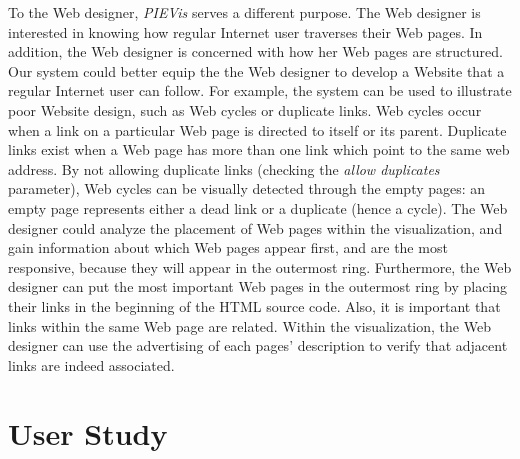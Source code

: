 \documentclass[]{article}
\begin{document}
{To the Web designer, {\em PIEVis} serves a different purpose.  The Web designer is interested in knowing how regular Internet user traverses their Web pages.
In addition, the Web designer is concerned with how her Web pages are structured.  
Our system could better equip the the Web designer to develop a Website that a regular Internet user can follow.  
For example, the system can be used to illustrate poor Website design, such as Web cycles or duplicate links.  
Web cycles occur when a link on a particular Web page is directed to itself or its parent. 
Duplicate links exist when a Web page has more than one link which point to the same web address.  
By not allowing duplicate links (checking the {\em allow duplicates} parameter), Web cycles can be visually detected through the empty pages: an empty page represents either a dead link or a duplicate (hence a cycle).
The Web designer could analyze the placement of Web pages within the visualization, and gain information about which Web pages appear first, and are the most responsive, because they will appear in the outermost ring.
Furthermore, the Web designer can put the most important Web pages in the outermost ring by placing their links in the beginning of the HTML source code.
Also, it is important that links within the same Web page are related.  Within the visualization, the Web designer can use the advertising of each pages' description to verify that adjacent links are indeed associated.

\section{User Study}
\label{se:user_study}

}
\end{document}
